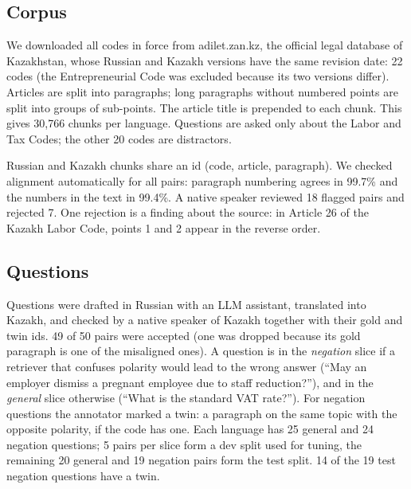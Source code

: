 \documentclass[11pt]{article}
\begin{document}
\subsection{Corpus}
We downloaded all codes in force from adilet.zan.kz, the official legal database of Kazakhstan, whose Russian
and Kazakh versions have the same revision date: 22 codes (the Entrepreneurial Code was excluded because its
two versions differ). Articles are split into paragraphs; long paragraphs without numbered points are split
into groups of sub-points. The article title is prepended to each chunk. This gives 30,766 chunks per
language. Questions are asked only about the Labor and Tax Codes; the other 20 codes are distractors.

Russian and Kazakh chunks share an id (code, article, paragraph). We checked alignment automatically for all
pairs: paragraph numbering agrees in 99.7\% and the numbers in the text in 99.4\%. A native speaker reviewed
18 flagged pairs and rejected 7. One rejection is a finding about the source: in Article 26 of the Kazakh
Labor Code, points 1 and 2 appear in the reverse order.

\subsection{Questions}
Questions were drafted in Russian with an LLM assistant, translated into Kazakh, and checked by a native
speaker of Kazakh together with their gold and twin ids. 49 of 50 pairs were accepted (one was dropped
because its gold paragraph is one of the misaligned ones). A question is in the \emph{negation} slice if a
retriever that confuses polarity would lead to the wrong answer (``May an employer dismiss a pregnant
employee due to staff reduction?''), and in the \emph{general} slice otherwise (``What is the standard VAT
rate?''). For negation questions the annotator marked a twin: a paragraph on the same topic with the
opposite polarity, if the code has one. Each language has 25 general and 24 negation questions; 5 pairs per
slice form a dev split used for tuning, the remaining 20 general and 19 negation pairs form the test split.
14 of the 19 test negation questions have a twin.
\end{document}

